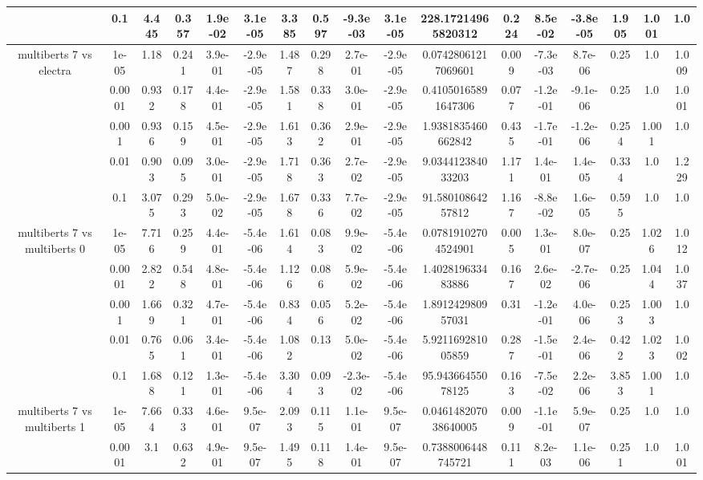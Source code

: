\begin{tabular}{|c|c|c|c|c|c|c|c|c|c|c|c|c|c|c|c|c|}
 & 0.1 & 4.445 & 0.357 & 1.9e-02 & 3.1e-05 & 3.385 & 0.597 & -9.3e-03 & 3.1e-05 & 228.17214965820312 & 0.224 & 8.5e-02 & -3.8e-05 & 1.905 & 1.001 & 1.0 \\
\hline
\multirow{5}{*}{multiberts 7 vs electra } & 1e-05 & 1.18 & 0.241 & 3.9e-01 & -2.9e-05 & 1.487 & 0.298 & 2.7e-01 & -2.9e-05 & 0.07428061217069601 & 0.009 & -7.3e-03 & 8.7e-06 & 0.25 & 1.0 & 1.009 \\
 & 0.0001 & 0.932 & 0.178 & 4.4e-01 & -2.9e-05 & 1.581 & 0.338 & 3.0e-01 & -2.9e-05 & 0.41050165891647306 & 0.077 & -1.2e-01 & -9.1e-06 & 0.25 & 1.0 & 1.001 \\
 & 0.001 & 0.936 & 0.159 & 4.5e-01 & -2.9e-05 & 1.613 & 0.362 & 2.9e-01 & -2.9e-05 & 1.9381835460662842 & 0.435 & -1.7e-01 & -1.2e-06 & 0.254 & 1.001 & 1.0 \\
 & 0.01 & 0.903 & 0.095 & 3.0e-01 & -2.9e-05 & 1.718 & 0.363 & 2.7e-02 & -2.9e-05 & 9.034412384033203 & 1.171 & 1.4e-01 & 1.4e-05 & 0.334 & 1.0 & 1.229 \\
 & 0.1 & 3.075 & 0.293 & 5.0e-02 & -2.9e-05 & 1.678 & 0.336 & 7.7e-02 & -2.9e-05 & 91.58010864257812 & 1.167 & -8.8e-02 & 1.6e-05 & 0.595 & 1.0 & 1.0 \\
\hline
\multirow{5}{*}{multiberts 7 vs multiberts 0} & 1e-05 & 7.716 & 0.259 & 4.4e-01 & -5.4e-06 & 1.614 & 0.083 & 9.9e-02 & -5.4e-06 & 0.07819102704524901 & 0.005 & 1.3e-01 & 8.0e-07 & 0.25 & 1.026 & 1.012 \\
 & 0.0001 & 2.822 & 0.548 & 4.8e-01 & -5.4e-06 & 1.126 & 0.086 & 5.9e-02 & -5.4e-06 & 1.402819633483886 & 0.167 & 2.6e-02 & -2.7e-06 & 0.25 & 1.044 & 1.037 \\
 & 0.001 & 1.669 & 0.321 & 4.7e-01 & -5.4e-06 & 0.834 & 0.056 & 5.2e-02 & -5.4e-06 & 1.891242980957031 & 0.31 & -1.2e-01 & 4.0e-06 & 0.253 & 1.003 & 1.0 \\
 & 0.01 & 0.765 & 0.061 & 3.4e-01 & -5.4e-06 & 1.082 & 0.13 & 5.0e-02 & -5.4e-06 & 5.921169281005859 & 0.287 & -1.5e-01 & 2.4e-06 & 0.422 & 1.023 & 1.002 \\
 & 0.1 & 1.688 & 0.121 & 1.3e-01 & -5.4e-06 & 3.304 & 0.093 & -2.3e-02 & -5.4e-06 & 95.94366455078125 & 0.163 & -7.5e-02 & 2.2e-06 & 3.853 & 1.001 & 1.0 \\
\hline
\multirow{5}{*}{multiberts 7 vs multiberts 1} & 1e-05 & 7.664 & 0.333 & 4.6e-01 & 9.5e-07 & 2.093 & 0.115 & 1.1e-01 & 9.5e-07 & 0.046148207038640005 & 0.009 & -1.1e-01 & 5.9e-07 & 0.25 & 1.0 & 1.0 \\
 & 0.0001 & 3.1 & 0.632 & 4.9e-01 & 9.5e-07 & 1.495 & 0.118 & 1.4e-01 & 9.5e-07 & 0.7388006448745721 & 0.111 & 8.2e-03 & 1.1e-06 & 0.251 & 1.0 & 1.001 \\

\end{tabular}
